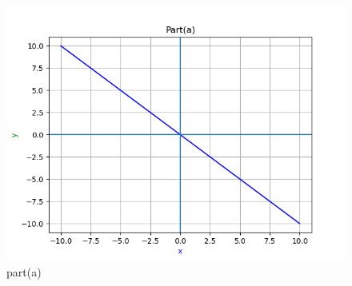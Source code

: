 \begin{enumerate}[label=\thesection.\arabic*.,ref=\thesection.\theenumi]
\begin{enumerate}
\renewcommand{\thefigure}{\theenumi.\arabic{figure}}
\begin{figure}[!ht]
    \centering
    \includegraphics[width=\columnwidth]{./figures/MT_A1_a}
\caption{part(a)}
\label{fig: part(a)}
\end{figure}

\end{enumerate}

\end{enumerate}


